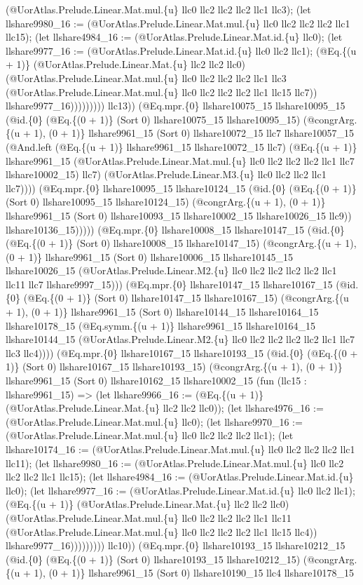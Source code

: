 \documentclass[11pt]{article}
\begin{document}
(@UorAtlas.Prelude.Linear.Mat.mul.\{u\} llc0 llc2 llc2 llc2 llc1 llc3); (let llshare9980\_16 := (@UorAtlas.Prelude.Linear.Mat.mul.\{u\} llc0 llc2 llc2 llc2 llc1 llc15); (let llshare4984\_16 := (@UorAtlas.Prelude.Linear.Mat.id.\{u\} llc0); (let llshare9977\_16 := (@UorAtlas.Prelude.Linear.Mat.id.\{u\} llc0 llc2 llc1); (@Eq.\{(u + 1)\} (@UorAtlas.Prelude.Linear.Mat.\{u\} llc2 llc2 llc0) (@UorAtlas.Prelude.Linear.Mat.mul.\{u\} llc0 llc2 llc2 llc2 llc1 llc3 (@UorAtlas.Prelude.Linear.Mat.mul.\{u\} llc0 llc2 llc2 llc2 llc1 llc15 llc7)) llshare9977\_16))))))))) llc13)) (@Eq.mpr.\{0\} llshare10075\_15 llshare10095\_15 (@id.\{0\} (@Eq.\{(0 + 1)\} (Sort 0) llshare10075\_15 llshare10095\_15) (@congrArg.\{(u + 1), (0 + 1)\} llshare9961\_15 (Sort 0) llshare10072\_15 llc7 llshare10057\_15 (@And.left (@Eq.\{(u + 1)\} llshare9961\_15 llshare10072\_15 llc7) (@Eq.\{(u + 1)\} llshare9961\_15 (@UorAtlas.Prelude.Linear.Mat.mul.\{u\} llc0 llc2 llc2 llc2 llc1 llc7 llshare10002\_15) llc7) (@UorAtlas.Prelude.Linear.M3.\{u\} llc0 llc2 llc2 llc1 llc7)))) (@Eq.mpr.\{0\} llshare10095\_15 llshare10124\_15 (@id.\{0\} (@Eq.\{(0 + 1)\} (Sort 0) llshare10095\_15 llshare10124\_15) (@congrArg.\{(u + 1), (0 + 1)\} llshare9961\_15 (Sort 0) llshare10093\_15 llshare10002\_15 llshare10026\_15 llc9)) llshare10136\_15))))) (@Eq.mpr.\{0\} llshare10008\_15 llshare10147\_15 (@id.\{0\} (@Eq.\{(0 + 1)\} (Sort 0) llshare10008\_15 llshare10147\_15) (@congrArg.\{(u + 1), (0 + 1)\} llshare9961\_15 (Sort 0) llshare10006\_15 llshare10145\_15 llshare10026\_15 (@UorAtlas.Prelude.Linear.M2.\{u\} llc0 llc2 llc2 llc2 llc2 llc1 llc11 llc7 llshare9997\_15))) (@Eq.mpr.\{0\} llshare10147\_15 llshare10167\_15 (@id.\{0\} (@Eq.\{(0 + 1)\} (Sort 0) llshare10147\_15 llshare10167\_15) (@congrArg.\{(u + 1), (0 + 1)\} llshare9961\_15 (Sort 0) llshare10144\_15 llshare10164\_15 llshare10178\_15 (@Eq.symm.\{(u + 1)\} llshare9961\_15 llshare10164\_15 llshare10144\_15 (@UorAtlas.Prelude.Linear.M2.\{u\} llc0 llc2 llc2 llc2 llc2 llc1 llc7 llc3 llc4)))) (@Eq.mpr.\{0\} llshare10167\_15 llshare10193\_15 (@id.\{0\} (@Eq.\{(0 + 1)\} (Sort 0) llshare10167\_15 llshare10193\_15) (@congrArg.\{(u + 1), (0 + 1)\} llshare9961\_15 (Sort 0) llshare10162\_15 llshare10002\_15 (fun (llc15 : llshare9961\_15) => (let llshare9966\_16 := (@Eq.\{(u + 1)\} (@UorAtlas.Prelude.Linear.Mat.\{u\} llc2 llc2 llc0)); (let llshare4976\_16 := (@UorAtlas.Prelude.Linear.Mat.mul.\{u\} llc0); (let llshare9970\_16 := (@UorAtlas.Prelude.Linear.Mat.mul.\{u\} llc0 llc2 llc2 llc2 llc1); (let llshare10174\_16 := (@UorAtlas.Prelude.Linear.Mat.mul.\{u\} llc0 llc2 llc2 llc2 llc1 llc11); (let llshare9980\_16 := (@UorAtlas.Prelude.Linear.Mat.mul.\{u\} llc0 llc2 llc2 llc2 llc1 llc15); (let llshare4984\_16 := (@UorAtlas.Prelude.Linear.Mat.id.\{u\} llc0); (let llshare9977\_16 := (@UorAtlas.Prelude.Linear.Mat.id.\{u\} llc0 llc2 llc1); (@Eq.\{(u + 1)\} (@UorAtlas.Prelude.Linear.Mat.\{u\} llc2 llc2 llc0) (@UorAtlas.Prelude.Linear.Mat.mul.\{u\} llc0 llc2 llc2 llc2 llc1 llc11 (@UorAtlas.Prelude.Linear.Mat.mul.\{u\} llc0 llc2 llc2 llc2 llc1 llc15 llc4)) llshare9977\_16))))))))) llc10)) (@Eq.mpr.\{0\} llshare10193\_15 llshare10212\_15 (@id.\{0\} (@Eq.\{(0 + 1)\} (Sort 0) llshare10193\_15 llshare10212\_15) (@congrArg.\{(u + 1), (0 + 1)\} llshare9961\_15 (Sort 0) llshare10190\_15 llc4 llshare10178\_15 
\end{document}
